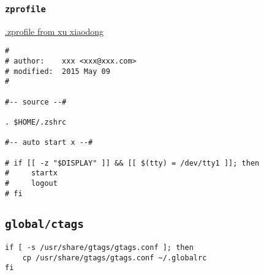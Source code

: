\documentclass[11pt]{article}
\begin{document}
\subsubsection{\texttt{zprofile}}
\label{sec:org42acbb6}

\href{https://github.com/xuxiaodong/dotman}{.zprofile from xu xiaodong}

\lstset{language=bash,label= ,caption= ,captionpos=b,numbers=none}
\begin{lstlisting}
#
# author:    xxx <xxx@xxx.com>
# modified:  2015 May 09
#

#-- source --#

. $HOME/.zshrc

#-- auto start x --#

# if [[ -z "$DISPLAY" ]] && [[ $(tty) = /dev/tty1 ]]; then
#     startx
#     logout
# fi
\end{lstlisting}

\subsection{\texttt{global/ctags}}
\label{sec:org490f6b3}

\lstset{language=bash,label= ,caption= ,captionpos=b,numbers=none}
\begin{lstlisting}
if [ -s /usr/share/gtags/gtags.conf ]; then
    cp /usr/share/gtags/gtags.conf ~/.globalrc
fi
\end{lstlisting}
\end{document}
